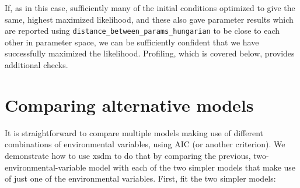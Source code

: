 \documentclass[11pt]{article}\usepackage[]{graphicx}\usepackage[]{xcolor}
\begin{document}
If, as in this case, sufficiently many of the initial conditions optimized to give the same, highest
maximized likelihood, and these also gave parameter results which are reported using 
\texttt{distance\_between\_params\_hungarian} to be close to each other in parameter space, we
can be sufficiently confident that we have successfully maximized the likelihood. 
Profiling, which is covered below, provides additional checks. 

\section{Comparing alternative models}

It is straightforward to compare multiple models making use of different combinations of
environmental variables, using AIC (or another criterion). We demonstrate how to use
xsdm to do that by comparing the previous, two-environmental-variable model with each
of the two simpler models that make use of just one of the environmental variables.
First, fit the two simpler models:
\end{document}
